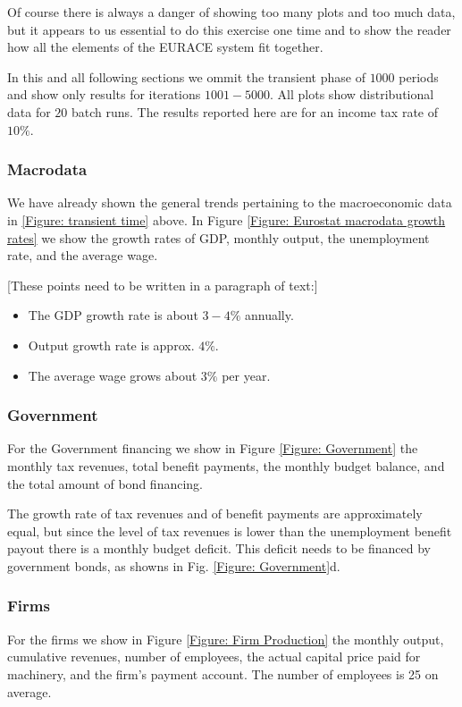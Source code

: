 \documentclass{article}
\begin{document}
Of course there is always a danger of showing too many plots and too much data,
but it appears to us essential to do this exercise one time and to show the reader how
all the elements of the EURACE system fit together.

In this and all following sections we ommit the transient phase of $1000$ periods and show only results for iterations $1001-5000$.
All plots show distributional data for $20$ batch runs. The results reported here are for an income tax rate of $10\%$.

\subsubsection*{Macrodata}
We have already shown the general trends pertaining to the macroeconomic data in \ref{Figure: transient time} above. 
In Figure \ref{Figure: Eurostat macrodata growth rates} we show the growth rates of GDP, monthly output, the unemployment rate, and the average wage.


[These points need to be written in a paragraph of text:]
\begin{itemize}
\item The GDP growth rate is about $3-4\%$ annually.
\item Output growth rate is approx. $4\%$.
\item The average wage grows about $3\%$ per year.
\end{itemize}

\subsubsection*{Government}
For the Government financing we show in Figure \ref{Figure: Government} the monthly tax revenues, total benefit payments, the monthly budget balance,
and the total amount of bond financing.

The growth rate of tax revenues and of benefit payments are approximately equal, but
since the level of tax revenues is lower than the unemployment benefit payout there is a monthly budget deficit.
This deficit needs to be financed by government bonds, as showns in Fig. \ref{Figure: Government}d.

\subsubsection*{Firms}
For the firms we show in Figure \ref{Figure: Firm Production} the monthly output, cumulative revenues, number of employees, the actual capital price paid for machinery, and the firm's payment account. The number of employees is 25 on average.
\end{document}
